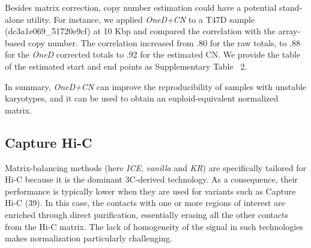 \documentclass[a4,center,fleqn]{NAR}
\providecommand{\DIFadd}[1]{{\protect\color{red}#1}} %
\providecommand{\DIFdel}[1]{{\protect}}                      %
\providecommand{\DIFaddbegin}{} %
\providecommand{\DIFaddend}{} %
\providecommand{\DIFdelbegin}{} %
\providecommand{\DIFdelend}{} %
\providecommand{\DIFdelFL}[1]{\DIFdel{#1}} %
\begin{document}
\DIFdelbegin %
{%
\DIFdelFL{Copy number correction A. Detail of a Hi-C matrix normalized with
different methods. The central portion has an increased copy number, which
affects normalization. }\textit{\DIFdelFL{ICE}} %
\DIFdelFL{fades it away, }\textit{\DIFdelFL{LGF}} %
\DIFdelFL{enhances
it and }\textit{\DIFdelFL{OneD}} %
\DIFdelFL{reduces the signal by about half. B. Profile of the
total amount of contacts after copy numer correction. The plot shows the
same region as panel A. The brown line represents the raw signal, the blue
line represents the signal after bias correction, the black line
represents the signal after bias and copy number (CN) correction.}}
\DIFdelend \DIFaddbegin \DIFadd{Besides matrix correction, copy number estimation could have a potential stand-alone
utility. For instance, we applied }\textit{\DIFadd{OneD+CN}} \DIFadd{to a T47D sample
(dc3a1e069\_51720e9cf) at 10 Kbp and compared the correlation with the
array-based copy number. The correlation increased from .80 for the raw totals,
to .88 for the }\textit{\DIFadd{OneD}} \DIFadd{corrected totals to .92 for the estimated CN. We
provide the table of the estimated start and end points as Supplementary Table~
2.
}\DIFaddend 

\DIFdelbegin \DIFdel{Figure~\ref{fig:cnv_correction}B shows the total sum of contacts after
correction for the copy number }\DIFdelend \DIFaddbegin \DIFadd{In summary, }\textit{\DIFadd{OneD+CN}} \DIFadd{can improve the reproducibility of samples
with unstable karyotypes, and it can be used to obtain an
euploid-equivalent normalized matrix.
}


\subsection{\DIFadd{Capture Hi-C}}

\DIFadd{Matrix-balancing methods (here }\textit{\DIFadd{ICE}}\DIFadd{, }\textit{\DIFadd{vanilla}} \DIFadd{and
}\textit{\DIFadd{KR}}\DIFadd{) are specifically tailored for Hi-C because it is the dominant
3C-derived technology. As a consequence, their performance is typically
lower when they are used for variants such as Capture Hi-C
(39). In this case, the contacts with one or more
regions of interest are enriched through direct purification, essentially
erasing all the other contacts from the Hi-C matrix. The lack of
homogeneity of the signal in such technologies makes normalization
particularly challenging.
}
\end{document}
